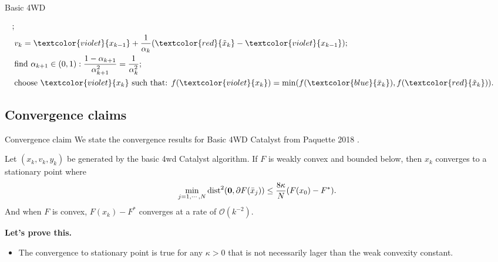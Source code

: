 \documentclass[11pt]{beamer}
\begin{document}
\begin{frame}{Basic 4WD}
\begin{definition}
{\begin{align*}
                    ;
                    \\
                    & v_{k} = \textcolor{violet}{x_{k - 1}} + \frac{1}{\alpha_k}(
                            \textcolor{red}{\tilde x_k} - \textcolor{violet}{x_{k - 1}}
                        );
                    \\
                    & 
                    \text{find } \alpha_{k + 1} \in (0, 1): 
                    \frac{1 - \alpha_{k + 1}}{\alpha_{k + 1}^2} = \frac{1}{\alpha_k^2};
                    \\
                    & \text{choose } \textcolor{violet}{x_k} \text{ such that:  } 
                    f(\textcolor{violet}{x_k}) = \min(f(\textcolor{blue}{\bar x_k}), f(\textcolor{red}{\tilde x_k})). 
                \end{align*}
            }
            \end{definition}
        \end{frame}
    \subsection{Convergence claims}
        \begin{frame}{Convergence claim}
            We state the convergence results for Basic 4WD Catalyst from Paquette 2018 \cite{paquette_catalyst_2018}. 
            \begin{theorem}
                Let $(x_k, v_k, y_k)$ be generated by the basic 4wd Catalyst algorithm. 
                If $F$ is weakly convex and bounded below, then $x_k$ converges to a stationary point where
                \begin{align*}
                    \min_{j = 1, \cdots, N} \operatorname{dist}^2(\mathbf 0, \partial F(\bar x_j))
                    \le \frac{8 \kappa}{N}(F(x_0) - F^*). 
                \end{align*}
                And when $F$ is convex, $F(x_k) - F^*$ converges at a rate of $\mathcal O(k^{-2})$. 
            \end{theorem}
            \pause
            \textbf{Let's prove this.} 
            \begin{itemize}
                \item The convergence to stationary point is true for any $\kappa > 0$ that is not necessarily lager than the weak convexity constant. 
            \end{itemize}
        \end{frame}
\end{document}
